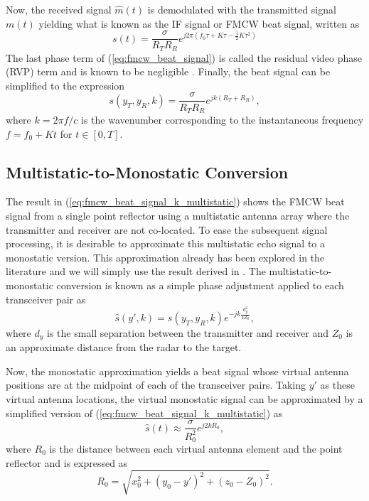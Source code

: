 \documentclass{ieeeaccess}
\begin{document}
Now, the received signal $\hat{m}(t)$ is demodulated with the transmitted signal $m(t)$ yielding what is known as the IF signal or FMCW beat signal, written as
\begin{equation}
\label{eq:fmcw_beat_signal}
    s(t) = \frac{\sigma}{R_T R_R}e^{j2\pi(f_0\tau +K\tau - \frac{1}{2}K\tau^2)}
\end{equation}
The last phase term of (\ref{eq:fmcw_beat_signal}) is called the residual video phase (RVP) term and is known to be negligible \cite{Yanik:NearFieldMIMOSAR}. Finally, the beat signal can be simplified to the expression
\begin{equation}
\label{eq:fmcw_beat_signal_k_multistatic}
    s(y_T,y_R,k) = \frac{\sigma}{R_T R_R} e^{jk(R_T + R_R)},
\end{equation}
where $k = 2\pi f/c$ is the wavenumber corresponding to the instantaneous frequency $f = f_0 + Kt$ for $t \in [0,T]$.

\subsection{Multistatic-to-Monostatic Conversion}
\label{subsec:mult_to_mono}
The result in (\ref{eq:fmcw_beat_signal_k_multistatic}) shows the FMCW beat signal from a single point reflector using a multistatic antenna array where the transmitter and receiver are not co-located. To ease the subsequent signal processing, it is desirable to approximate this multistatic echo signal to a monostatic version. This approximation already has been explored in the literature and we will simply use the result derived in \cite{Yanik:NearFieldMIMOSAR,Yanik:CascadedMIMO}. The multistatic-to-monostatic conversion is known as a simple phase adjustment applied to each transceiver pair as
\begin{equation}
\label{eq:mult-to-mono}
    \hat{s}(y',k) = s(y_T,y_R,k) e^{-jk\frac{d_y^2}{4Z_0}},
\end{equation}
where $d_y$ is the small separation between the transmitter and receiver and $Z_0$ is an approximate distance from the radar to the target.

Now, the monostatic approximation yields a beat signal whose virtual antenna positions are at the midpoint of each of the transceiver pairs. Taking $y'$ as these virtual antenna locations, the virtual monostatic signal can be approximated by a simplified version of (\ref{eq:fmcw_beat_signal_k_multistatic}) as
\begin{equation}
\label{eq:fmcw_beat_signal_k_monostatic}
    \hat{s}(t) \approx \frac{\sigma}{R_0^2} e^{j2kR_0},
\end{equation}
where $R_0$ is the distance between each virtual antenna element and the point reflector and is expressed as
\begin{equation}
    R_0 = \sqrt{x_0^2 + (y_0-y')^2 + (z_0-Z_0)^2}.
\end{equation}
\end{document}
